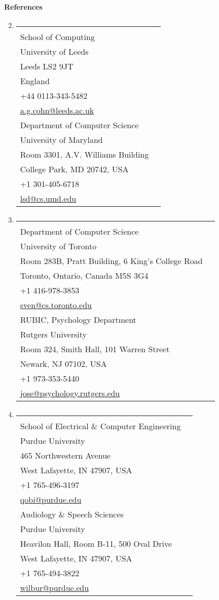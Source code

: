 \documentclass[10pt]{article}
\makeatletter
\newenvironment{benumerate}[2]{
    \let\oldItem\item
    \def\item{\addtocounter{enumi}{-2}\oldItem}
    \begin{enumerate}[#2]
    \setcounter{enumi}{#1}
    \addtocounter{enumi}{1}}
  {\end{enumerate}}
\newcommand{\reference}[7]{%
  \begin{tabular}{@{}l@{}}%
    \textbf{#1}\\%
    #2\\%
    #3\\%
    #4\\%
    #5\\%
    #6\\%
    \href{mailto:#7}{#7}%
  \end{tabular}%
}
\newcommand{\refrow}[2]{%
\item \begin{tabular*}{0.9\textwidth}{@{}p{3.0in}@{\hspace*{0.3in}}p{3.0in}@{}} #1 & #2 \end{tabular*}
\vspace*{1ex}}
\newenvironment{region}[3]{%
  \vspace*{0.5ex}
  {\large \textbf{#1}}
  \begin{benumerate}{#3}{\color{RoyalBlue}#2}}
  {\end{benumerate}}
\newenvironment{nonumregion}[1]{%
\begin{region}{#1}{}{1}}
{\end{region}}
\makeatother
\begin{document}
\begin{nonumregion}{References}
  \refrow{
    \reference{Tony Cohn}
    {School of Computing}
    {University of Leeds}
    {Leeds LS2 9JT}
    {England}
    {+44 0113-343-5482}
    {a.g.cohn@leeds.ac.uk}
  }{
    \reference{Larry Davis}
    {Department of Computer Science}
    {University of Maryland}
    {Room 3301, A.V. Williams Building}
    {College Park, MD 20742, USA}
    {+1 301-405-6718}
    {lsd@cs.umd.edu}
  }
  \refrow{
    \reference{Sven Dickinson}
    {Department of Computer Science}
    {University of Toronto}
    {Room 283B, Pratt Building, 6 King's College Road}
    {Toronto, Ontario, Canada M5S 3G4}
    {+1 416-978-3853}
    {sven@cs.toronto.edu}
  }{
    \reference{Stephen Jos\'e Hanson}
    {RUBIC, Psychology Department}
    {Rutgers University}
    {Room 324, Smith Hall, 101 Warren Street}
    {Newark, NJ 07102, USA}
    {+1 973-353-5440}
    {jose@psychology.rutgers.edu}
  }
  \refrow{
    \reference{Jeffrey Mark Siskind}
    {School of Electrical \& Computer Engineering}
    {Purdue University}
    {465 Northwestern Avenue}
    {West Lafayette, IN 47907, USA}
    {+1 765-496-3197}
    {qobi@purdue.edu}
  }{
    \reference{Ronnie Wilbur}
    {Audiology \& Speech Sciences}
    {Purdue University}
    {Heavilon Hall, Room B-11, 500 Oval Drive}
    {West Lafayette, IN 47907, USA}
    {+1 765-494-3822}
    {wilbur@purdue.edu}
  }
\end{nonumregion}
\end{document}
